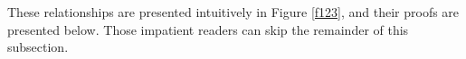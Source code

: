 \documentclass[journal]{IEEEtran}
\begin{document}

These relationships are presented intuitively in Figure \ref{f123},
and their proofs are presented below.
Those impatient readers can skip the remainder of this subsection.

%
%
%
\end{document}
